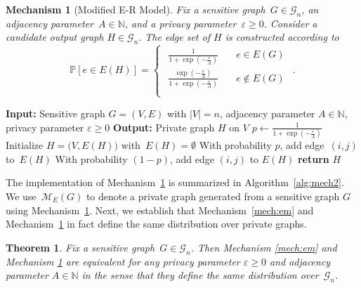 \documentclass[conference]{ieeeconf}
\newtheorem{theorem}{Theorem}
\newtheorem{mechanism}{Mechanism}
\newcommand{\G}{\mathcal{G}}
\newcommand{\Prob}{\mathbb{P}}
\begin{document}
\begin{mechanism}[Modified E-R Model] \label{mech:2}
Fix a sensitive graph~$G \in \G_n$, an adjacency parameter~$A \in \mathbb{N}$, 
and a privacy parameter~$\varepsilon \geq 0.$
Consider a candidate output graph $H\in \G_n.$
The edge set of $H$ is constructed according to
\begin{equation} \label{eq:P_eH2}
\Prob[e\in E(H)]=\begin{cases} 
\begin{aligned}
     \frac{1}{1+\exp(-\frac{\varepsilon}{A})} \quad &e\in E(G)\\
    \frac{\exp(-\frac{\varepsilon}{A})}{1+\exp(-\frac{\varepsilon}{A})} \quad &e\notin E(G)\\
\end{aligned}
\end{cases}.
\end{equation}
\end{mechanism}


\begin{algorithm}[t]
\caption{Modified E-R Model (Mechanism~\ref{mech:2})}
\label{alg:mech2}
\begin{algorithmic}[1]
\STATEx \textbf{Input:} Sensitive graph $G=(V,E)$ with $|V|=n$, adjacency parameter $A\in\mathbb{N}$, privacy parameter $\varepsilon \geq 0$
\STATEx \textbf{Output:} Private graph $H$ on $V$
\STATE $p \gets \frac{1}{1+\exp(-\frac{\varepsilon}{A})} $
\STATE Initialize $H = \big(V, E(H)\big)$ with~$E(H) = \emptyset$
      \STATE With probability $p$, add edge~$(i, j)$ to~$E(H)$
    \ELSE
      \STATE With probability $(1-p)$, add edge $(i,j)$ to $E(H)$
    \ENDIF
  \ENDFOR
\ENDFOR
\STATE \textbf{return} $H$
\end{algorithmic}
\end{algorithm}

The implementation of Mechanism~\ref{mech:2} is summarized in Algorithm~\ref{alg:mech2}.
We use~$\mathcal{M}_E(G)$ to denote a private graph generated from a sensitive graph $G$ using Mechanism~\ref{mech:2}. 
Next, we establish that Mechanism~\ref{mech:em} and Mechanism~\ref{mech:2} 
in fact define the same distribution over private graphs. 

\begin{theorem}\label{thm:equiv}
    Fix a sensitive graph~$G \in \G_n$. Then 
    Mechanism \ref{mech:em} and Mechanism \ref{mech:2} are equivalent for any privacy parameter $\varepsilon \geq 0$ and adjacency parameter $A \in \mathbb{N}$
    in the sense that they define the same distribution over~$\mathcal{G}_n$. 
\end{theorem}
    
\end{document}
